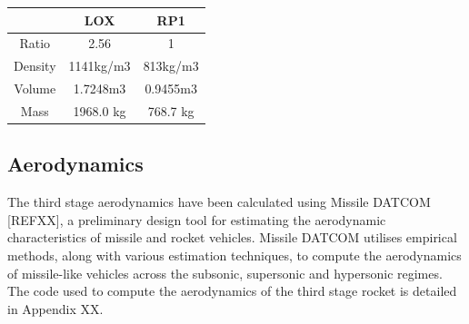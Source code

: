 \begin{tabular}{|c|c|c|}
	\hline  & \textbf{LOX} & \textbf{RP1} \\ 
	\hline Ratio & 2.56 & 1 \\ 
	\hline Density & 1141kg/m3 & 813kg/m3 \cite{Magee}\\ 
	\hline Volume & 1.7248m3 & 0.9455m3 \\ 
	\hline Mass & 1968.0 kg & 768.7 kg \\ 
	\hline 
\end{tabular} 
		
		

		\subsection{Aerodynamics}
		
		The third stage aerodynamics have been calculated using Missile DATCOM [REFXX], a preliminary design tool for estimating the aerodynamic characteristics of missile and rocket vehicles. Missile DATCOM utilises empirical methods, along with various estimation techniques, to compute the aerodynamics of missile-like vehicles across the subsonic, supersonic and hypersonic regimes.  The code used to compute the aerodynamics of the third stage rocket is detailed in Appendix XX.  
		
